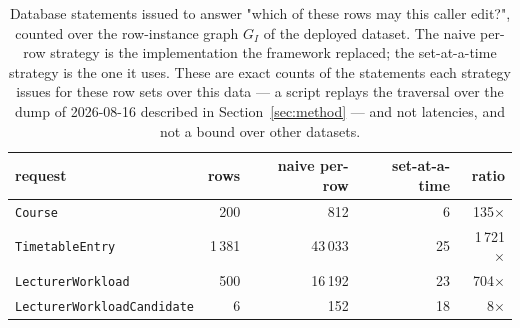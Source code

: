 \begin{table}[t]
\centering
\caption{Database statements issued to answer "which of these rows may this caller edit?", counted over the row-instance graph $G_I$ of the deployed dataset. The naive per-row strategy is the implementation the framework replaced; the set-at-a-time strategy is the one it uses. These are exact counts of the statements each strategy issues for these row sets over this data --- a script replays the traversal over the dump of 2026-08-16 described in Section~\ref{sec:method} --- and not latencies, and not a bound over other datasets.}
\label{tab:queries}
\small
\begin{tabular}{@{}lrrrr@{}}
\toprule
request & rows & naive per-row & set-at-a-time & ratio \\
\midrule
\texttt{Course} & 200 & 812 & 6 & 135$\times$ \\
\texttt{TimetableEntry} & 1\,381 & 43\,033 & 25 & 1\,721$\times$ \\
\texttt{LecturerWorkload} & 500 & 16\,192 & 23 & 704$\times$ \\
\texttt{LecturerWorkloadCandidate} & 6 & 152 & 18 & 8$\times$ \\
\bottomrule
\end{tabular}
\end{table}
